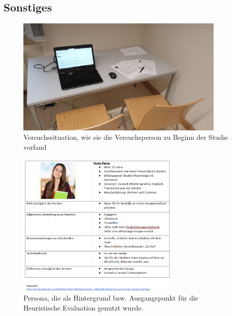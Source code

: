 \subsection{Sonstiges}

\begin{figure}[h]
    \includegraphics[width=0.9\textwidth]{images/Sonstiges/Studie-Aufbau.jpg}
    \centering
    \caption{Versuchssituation, wie sie die Versuchsperson zu Beginn der Studie vorfand}
    \label{fig:aufbau}
\end{figure}

\begin{figure}[h]
    \includegraphics[width=0.7\textwidth]{images/Sonstiges/persona.PNG}
    \centering
    \caption{Persona, die als Hintergrund bzw. Ausgangspunkt für die Heuristische Evaluation genutzt wurde.}
    \label{fig:persona}
\end{figure}



